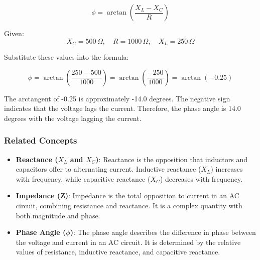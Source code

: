 \[
\phi = \arctan\left(\frac{X_L - X_C}{R}\right)
\]

Given:
\[
X_C = 500 \, \Omega, \quad R = 1000 \, \Omega, \quad X_L = 250 \, \Omega
\]

Substitute these values into the formula:

\[
\phi = \arctan\left(\frac{250 - 500}{1000}\right) = \arctan\left(\frac{-250}{1000}\right) = \arctan(-0.25)
\]

The arctangent of -0.25 is approximately -14.0 degrees. The negative sign indicates that the voltage lags the current. Therefore, the phase angle is 14.0 degrees with the voltage lagging the current.

\subsubsection{Related Concepts}
\begin{itemize}
    \item \textbf{Reactance (\(X_L\) and \(X_C\))}: Reactance is the opposition that inductors and capacitors offer to alternating current. Inductive reactance (\(X_L\)) increases with frequency, while capacitive reactance (\(X_C\)) decreases with frequency.
    \item \textbf{Impedance (Z)}: Impedance is the total opposition to current in an AC circuit, combining resistance and reactance. It is a complex quantity with both magnitude and phase.
    \item \textbf{Phase Angle (\(\phi\))}: The phase angle describes the difference in phase between the voltage and current in an AC circuit. It is determined by the relative values of resistance, inductive reactance, and capacitive reactance.
\end{itemize}


